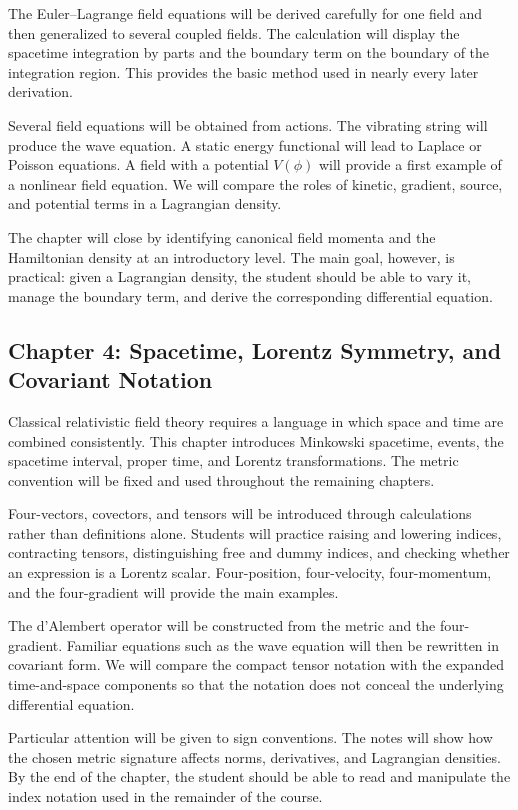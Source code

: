 The Euler--Lagrange field equations will be derived carefully for one field and then generalized to several coupled fields. The calculation will display the spacetime integration by parts and the boundary term on the boundary of the integration region. This provides the basic method used in nearly every later derivation.

Several field equations will be obtained from actions. The vibrating string will produce the wave equation. A static energy functional will lead to Laplace or Poisson equations. A field with a potential \(V(\phi)\) will provide a first example of a nonlinear field equation. We will compare the roles of kinetic, gradient, source, and potential terms in a Lagrangian density.

The chapter will close by identifying canonical field momenta and the Hamiltonian density at an introductory level. The main goal, however, is practical: given a Lagrangian density, the student should be able to vary it, manage the boundary term, and derive the corresponding differential equation.

\subsection*{Chapter 4: Spacetime, Lorentz Symmetry, and Covariant Notation}

Classical relativistic field theory requires a language in which space and time are combined consistently. This chapter introduces Minkowski spacetime, events, the spacetime interval, proper time, and Lorentz transformations. The metric convention will be fixed and used throughout the remaining chapters.

Four-vectors, covectors, and tensors will be introduced through calculations rather than definitions alone. Students will practice raising and lowering indices, contracting tensors, distinguishing free and dummy indices, and checking whether an expression is a Lorentz scalar. Four-position, four-velocity, four-momentum, and the four-gradient will provide the main examples.

The d'Alembert operator will be constructed from the metric and the four-gradient. Familiar equations such as the wave equation will then be rewritten in covariant form. We will compare the compact tensor notation with the expanded time-and-space components so that the notation does not conceal the underlying differential equation.

Particular attention will be given to sign conventions. The notes will show how the chosen metric signature affects norms, derivatives, and Lagrangian densities. By the end of the chapter, the student should be able to read and manipulate the index notation used in the remainder of the course.

